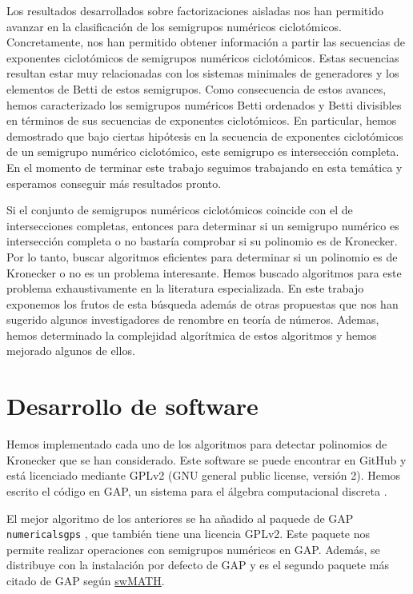 Los resultados desarrollados sobre factorizaciones aisladas nos han permitido avanzar en la clasificación de los semigrupos numéricos ciclotómicos. Concretamente, nos han permitido obtener información a partir las secuencias de exponentes ciclotómicos de semigrupos numéricos ciclotómicos. Estas secuencias resultan estar muy relacionadas con los sistemas minimales de generadores y los elementos de Betti de estos semigrupos. Como consecuencia de estos avances, hemos caracterizado los semigrupos numéricos Betti ordenados y Betti divisibles en términos de sus secuencias de exponentes ciclotómicos. En particular, hemos demostrado que bajo ciertas hipótesis en la secuencia de exponentes ciclotómicos de un semigrupo numérico ciclotómico, este semigrupo es intersección completa. En el momento de terminar este trabajo seguimos trabajando en esta temática y esperamos conseguir más resultados pronto.

Si el conjunto de semigrupos numéricos ciclotómicos coincide con el de intersecciones completas, entonces para determinar si un semigrupo numérico es intersección completa o no bastaría comprobar si su polinomio es de Kronecker. Por lo tanto, buscar algoritmos eficientes para determinar si un polinomio es de Kronecker o no es un problema interesante. Hemos buscado algoritmos para este problema exhaustivamente en la literatura especializada. En este trabajo exponemos los frutos de esta búsqueda además de otras propuestas que nos han sugerido algunos investigadores de renombre en teoría de números. Ademas, hemos determinado la complejidad algorítmica de estos algoritmos y hemos mejorado algunos de ellos.

\section*{Desarrollo de software}

Hemos implementado cada uno de los algoritmos para detectar polinomios de Kronecker que se han considerado. Este software se puede encontrar en GitHub \cite{kronecker-algorithms} y está licenciado mediante GPLv2 (GNU general public license, versión 2). Hemos escrito el código en GAP, un sistema para el álgebra computacional discreta \cite{gap}.

El mejor algoritmo de los anteriores se ha añadido al paquede de GAP \texttt{numericalsgps} \cite{numericalsgps}, que también tiene una licencia GPLv2. Este paquete nos permite realizar operaciones con semigrupos numéricos en GAP. Además, se distribuye con la instalación por defecto de GAP y es el segundo paquete más citado de GAP según \href{https://www.swmath.org/?term=gap\&which_search=standard}{swMATH}. 

